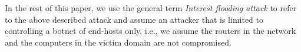 In the rest of this paper, we use the general term \emph{Interest flooding attack} to refer to the above described attack and assume an attacker that is limited to controlling a botnet of end-hosts only, i.e., we assume the routers in the network and the computers in the victim domain are not compromised.







